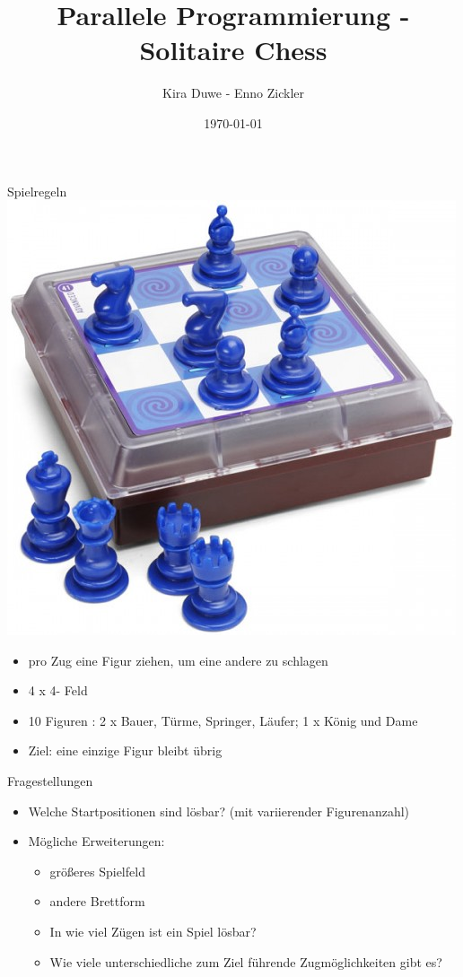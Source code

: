 \documentclass{beamer}
\title{Parallele Programmierung - Solitaire Chess}
\author{Kira Duwe - Enno Zickler}
\institute{DKRZ- UHH}
\date{\today}
\begin{document}
\begin{frame}
\titlepage
\end{frame}


\begin{frame}{Spielregeln}
\includegraphics[scale=0.2]{solitaire}
\begin{itemize}

	
	\item pro Zug eine Figur ziehen, um eine andere zu schlagen
	\item 4 x 4- Feld
	\item 10 Figuren : 2 x Bauer, Türme, Springer, Läufer; 1 x König und Dame
	\item Ziel: eine einzige Figur bleibt übrig

\end{itemize}
\end{frame}

\begin{frame}{Fragestellungen}
\begin{itemize}

	\item Welche Startpositionen sind lösbar? (mit variierender Figurenanzahl)
	\item Mögliche Erweiterungen: 
	\begin{itemize}
	\item größeres Spielfeld 
	\item andere Brettform
	\item In wie viel Zügen ist ein Spiel lösbar? 
	\item Wie viele unterschiedliche zum Ziel führende Zugmöglichkeiten gibt es?
	\end{itemize}
\end{itemize}
\end{frame}
\end{document}
